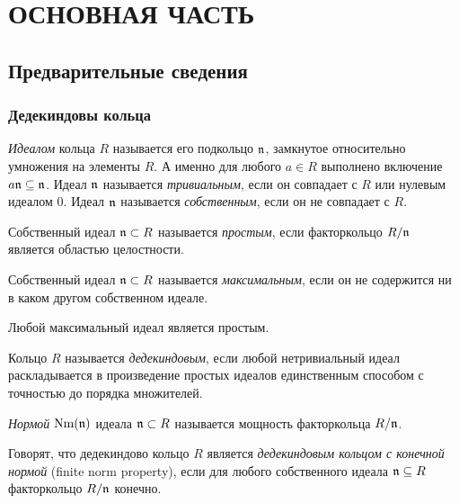\documentclass[_00_autoref.tex]{subfiles}
\begin{document}
{\let\clearpage\relax\vspace{2.2ex}
\chapter*{\MakeUppercase{ОСНОВНАЯ ЧАСТЬ}}\vspace{-2ex}}

\section{Предварительные сведения}

\subsection{Дедекиндовы кольца}

\begin{definition}
    \emph{Идеалом} кольца $R$ называется его подкольцо $\mathfrak{n}$, замкнутое относительно умножения на элементы $R$.
    А именно для любого $a \in R$ выполнено включение $a\mathfrak{n} \subseteq \mathfrak{n}$.
    Идеал $\mathfrak{n}$ называется \emph{тривиальным}, если он совпадает с $R$ или нулевым идеалом $0$.
    Идеал $\mathfrak{n}$ называется \emph{собственным}, если он не совпадает с $R$.
\end{definition}

\begin{definition}
    Собственный идеал $\mathfrak{n} \subset R$ называется \emph{простым}, если факторкольцо $R/\mathfrak{n}$ является областью целостности.
\end{definition}

\begin{definition}
    Собственный идеал $\mathfrak{n} \subset R$ называется \emph{максимальным}, если он не содержится ни в каком другом собственном идеале.
\end{definition}

\begin{remark}
    Любой максимальный идеал является простым.
\end{remark}

\begin{definition}
    Кольцо $R$ называется \emph{дедекиндовым}, если любой нетривиальный идеал раскладывается в произведение простых идеалов единственным способом с точностью до порядка множителей.
\end{definition}

\begin{definition}
    \emph{Нормой} $\textrm{Nm}(\mathfrak{n})$ идеала $\mathfrak{n} \subset R$ называется мощность факторкольца $R/\mathfrak{n}$.

    Говорят, что дедекиндово кольцо $R$ является \emph{дедекиндовым кольцом с конечной нормой} (finite norm property), если для любого собственного идеала $\mathfrak{n} \subseteq R$ факторкольцо $R/\mathfrak{n}$ конечно.
\end{definition}
\end{document}

